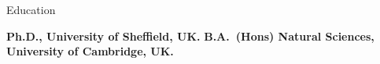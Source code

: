 \begin{rubric}{Education}

\entry*[2014 -- 2018]%
	\textbf{Ph.D., University of Sheffield, UK.}
%
\entry*[2010 -- 2013]%
	\textbf{B.A.~(Hons) Natural Sciences, University of Cambridge, UK.}\par
%
\end{rubric}